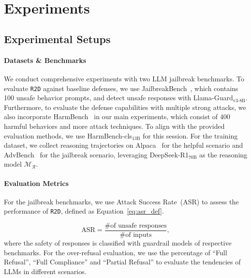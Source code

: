 \section{Experiments}
\subsection{Experimental Setups}
\paragraph{Datasets \& Benchmarks} We conduct comprehensive experiments with two LLM jailbreak benchmarks. To evaluate \texttt{R2D} against baseline defenses, we use JailbreakBench~\cite{chao2024jailbreakbench}, which contains 100 unsafe behavior prompts, and detect unsafe responses with Llama-Guard$_\text{v3-8B}$. Furthermore, to evaluate the defense capabilities with multiple strong attacks, we also incorporate HarmBench~\cite{pmlr-v235-mazeika24a} in our main experiments, which consist of 400 harmful behaviors and more attack techniques. To align with the provided evaluation methods, we use HarmBench-cls$_\text{13B}$ for this session. For the training dataset, we collect reasoning trajectories on Alpaca~\cite{taori2023alpaca} for the helpful scenario and AdvBench~\cite{zou2023universal} for the jailbreak scenario, leveraging  DeepSeek-R1$_\text{70B}$ as the reasoning model $\mathcal{M_R}$.

\paragraph{Evaluation Metrics} For the jailbreak benchmarks, we use Attack Success Rate~(ASR) to assess the performance of \texttt{R2D}, defined as Equation~\ref{eq:asr_def}.

\begin{equation}
\label{eq:asr_def}
    \text{ASR} = \frac{\text{\# of unsafe responses}}{\text{\# of inputs}},
\end{equation}
where the safety of responses is classified with guardrail models of respective benchmarks. For the over-refusal evaluation, we use the percentage of ``Full Refusal'', ``Full Compliance'' and ``Partial Refusal'' to evaluate the tendencies  of LLMs in different scenarios.

